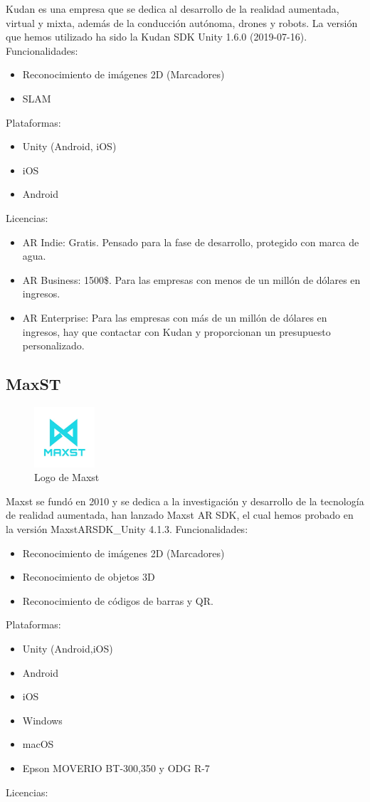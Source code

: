 Kudan es una empresa que se dedica al desarrollo de la realidad aumentada, virtual y mixta, además de la conducción autónoma, drones y robots. La versión que hemos utilizado ha sido la Kudan SDK Unity 1.6.0 (2019-07-16).\cite{Kudan}
Funcionalidades:
\begin{itemize}
\item Reconocimiento de imágenes 2D (Marcadores)
\item SLAM
\end{itemize}
Plataformas:
\begin{itemize}
\item Unity (Android, iOS)
\item iOS
\item Android
\end{itemize}
Licencias:
\begin{itemize}
\item AR Indie: Gratis. Pensado para la fase de desarrollo, protegido con marca de agua.
\item AR Business: 1500\$. Para las empresas con menos de un millón de dólares en ingresos.
\item AR Enterprise: Para las empresas con más de un millón de dólares en ingresos, hay que contactar con Kudan y proporcionan un presupuesto personalizado.
\end{itemize}


\subsection{MaxST}

 \begin{figure}[H]
    \centering
    \includegraphics[width=0.2\textwidth]{Images/Maxst_Logo.jpeg}
    \caption{Logo de Maxst}
    \label{fig:Maxst}
\end{figure}

Maxst se fundó en 2010 y se dedica a la investigación y desarrollo de la tecnología de realidad aumentada, han lanzado Maxst AR SDK, el cual hemos probado en la versión MaxstARSDK\_Unity 4.1.3. \cite{Maxst}
Funcionalidades:
\begin{itemize}
\item Reconocimiento de imágenes 2D (Marcadores)
\item Reconocimiento de objetos 3D
\item Reconocimiento de códigos de barras y QR.
\end{itemize}
Plataformas:
\begin{itemize}
\item Unity (Android,iOS)
\item Android
\item iOS
\item Windows
\item macOS
\item Epson MOVERIO BT-300,350 y ODG R-7
\end{itemize}
Licencias:

